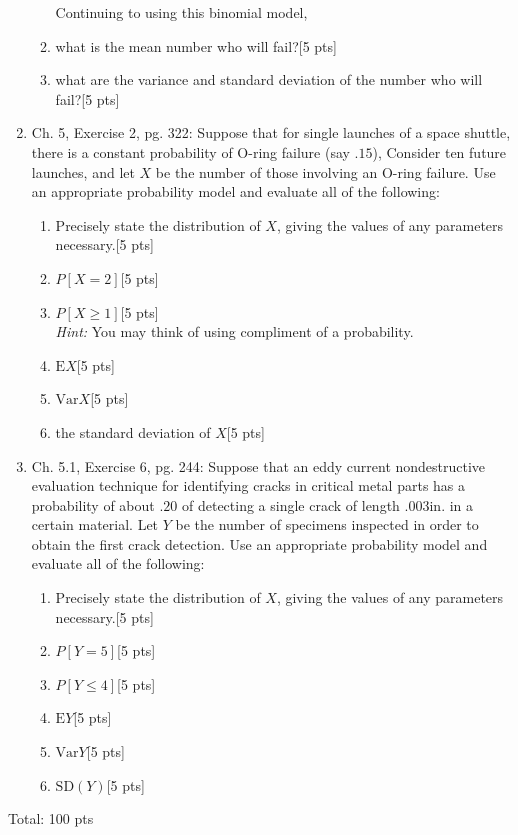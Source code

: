 \documentclass[11pt]{article}\usepackage[]{graphicx}\usepackage[]{color}
\begin{document}
\begin{enumerate}
\begin{enumerate}
Continuing to using this binomial model,
        \item what is the mean number who will fail?[5 pts]
        \item what are the variance and standard deviation of the number who will fail?[5 pts]
  \end{enumerate}



\item Ch. 5, Exercise 2, pg. 322: Suppose that for single launches of a space shuttle, there is a constant probability of O-ring failure (say $.15$), Consider ten future launches, and let $X$ be the number of those involving an O-ring failure. Use an appropriate probability model and evaluate all of the following:
    \begin{enumerate}
          \item Precisely state the distribution of $X$, giving the values of any parameters necessary.[5 pts]
          \item $P[X = 2]$[5 pts]
          \item $P[X \ge 1]$[5 pts]\\
          \emph{Hint:} You may think of using compliment of a probability. 
          \item $\text{E}X$[5 pts]
          \item $\text{Var} X$[5 pts]
          \item the standard deviation of $X$[5 pts]
    \end{enumerate}

\item Ch. 5.1, Exercise 6, pg. 244: Suppose that an eddy current nondestructive evaluation technique for identifying cracks in critical metal parts has a probability of about $.20$ of detecting a single crack of length $.003$in. in a certain material. Let $Y$ be the number of specimens inspected in order to obtain the first crack detection. Use an appropriate probability model and evaluate all of the following:
    \begin{enumerate}
        \item Precisely state the distribution of $X$, giving the values of any parameters necessary.[5 pts]
        \item $P[Y = 5]$[5 pts]
        \item $P[Y \le 4]$[5 pts]
        \item $\text{E}Y$[5 pts]
        \item $\text{Var}Y$[5 pts]
        \item $\text{SD}(Y)$[5 pts]
    \end{enumerate}


\end{enumerate}


Total: 100 pts
\end{document}
